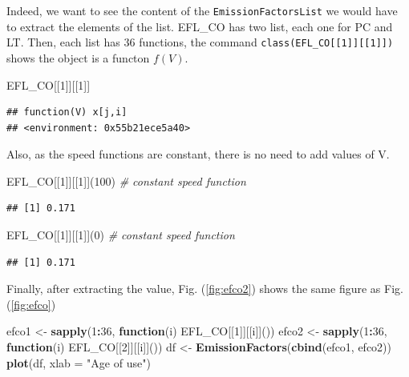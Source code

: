 \documentclass[12pt,graybox,envcountchap,sectrefs]{krantz}
\makeatletter
\newenvironment{Shaded}{\begin{snugshade}}{\end{snugshade}}
\newcommand{\KeywordTok}[1]{\textcolor[rgb]{0.13,0.29,0.53}{\textbf{#1}}}
\newcommand{\DataTypeTok}[1]{\textcolor[rgb]{0.13,0.29,0.53}{#1}}
\newcommand{\DecValTok}[1]{\textcolor[rgb]{0.00,0.00,0.81}{#1}}
\newcommand{\StringTok}[1]{\textcolor[rgb]{0.31,0.60,0.02}{#1}}
\newcommand{\CommentTok}[1]{\textcolor[rgb]{0.56,0.35,0.01}{\textit{#1}}}
\newcommand{\ControlFlowTok}[1]{\textcolor[rgb]{0.13,0.29,0.53}{\textbf{#1}}}
\newcommand{\OperatorTok}[1]{\textcolor[rgb]{0.81,0.36,0.00}{\textbf{#1}}}
\newcommand{\NormalTok}[1]{#1}
\newenvironment{kframe}{%
\medskip{}
\setlength{\fboxsep}{.8em}
 \def\at@end@of@kframe{}%
 \ifinner\ifhmode%
  \def\at@end@of@kframe{\end{minipage}}%
  \begin{minipage}{\columnwidth}%
 \fi\fi%
 \def\FrameCommand##1{\hskip\@totalleftmargin \hskip-\fboxsep
 \colorbox{shadecolor}{##1}\hskip-\fboxsep
     \hskip-\linewidth \hskip-\@totalleftmargin \hskip\columnwidth}%
 \MakeFramed {\advance\hsize-\width
   \@totalleftmargin\z@ \linewidth\hsize
   \@setminipage}}%
 {\par\unskip\endMakeFramed%
 \at@end@of@kframe}
\renewenvironment{Shaded}{\begin{kframe}}{\end{kframe}}
\theoremstyle{definition}
\theoremstyle{definition}
\theoremstyle{definition}
\theoremstyle{remark}
\makeatother
\begin{document}
Indeed, we want to see the content of the \texttt{EmissionFactorsList}
we would have to extract the elements of the list. EFL\_CO has two list,
each one for PC and LT. Then, each list has 36 functions, the command
\texttt{class(EFL\_CO{[}{[}1{]}{]}{[}{[}1{]}{]})} shows the object is a
functon \(f(V)\).

\begin{Shaded}
\begin{Highlighting}[]
\NormalTok{EFL_CO[[}\DecValTok{1}\NormalTok{]][[}\DecValTok{1}\NormalTok{]]}
\end{Highlighting}
\end{Shaded}

\begin{verbatim}
## function(V) x[j,i]
## <environment: 0x55b21ece5a40>
\end{verbatim}

Also, as the speed functions are constant, there is no need to add
values of V.

\begin{Shaded}
\begin{Highlighting}[]
\NormalTok{EFL_CO[[}\DecValTok{1}\NormalTok{]][[}\DecValTok{1}\NormalTok{]](}\DecValTok{100}\NormalTok{) }\CommentTok{# constant speed function}
\end{Highlighting}
\end{Shaded}

\begin{verbatim}
## [1] 0.171
\end{verbatim}

\begin{Shaded}
\begin{Highlighting}[]
\NormalTok{EFL_CO[[}\DecValTok{1}\NormalTok{]][[}\DecValTok{1}\NormalTok{]](}\DecValTok{0}\NormalTok{)   }\CommentTok{# constant speed function}
\end{Highlighting}
\end{Shaded}

\begin{verbatim}
## [1] 0.171
\end{verbatim}

Finally, after extracting the value, Fig. (\ref{fig:efco2}) shows the
same figure as Fig. (\ref{fig:efco})

\begin{Shaded}
\begin{Highlighting}[]
\NormalTok{efco1 <-}\StringTok{ }\KeywordTok{sapply}\NormalTok{(}\DecValTok{1}\OperatorTok{:}\DecValTok{36}\NormalTok{, }\ControlFlowTok{function}\NormalTok{(i) EFL_CO[[}\DecValTok{1}\NormalTok{]][[i]]())}
\NormalTok{efco2 <-}\StringTok{ }\KeywordTok{sapply}\NormalTok{(}\DecValTok{1}\OperatorTok{:}\DecValTok{36}\NormalTok{, }\ControlFlowTok{function}\NormalTok{(i) EFL_CO[[}\DecValTok{2}\NormalTok{]][[i]]())}
\NormalTok{df <-}\StringTok{ }\KeywordTok{EmissionFactors}\NormalTok{(}\KeywordTok{cbind}\NormalTok{(efco1, efco2))}
\KeywordTok{plot}\NormalTok{(df, }\DataTypeTok{xlab =} \StringTok{"Age of use"}\NormalTok{)}
\end{Highlighting}
\end{Shaded}
\end{document}

